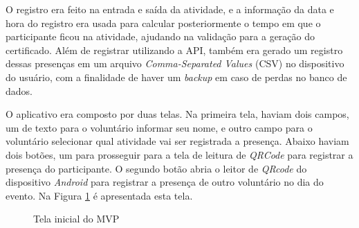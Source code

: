 O registro era feito na entrada e saída da atividade, e a informação da data e hora do registro era usada para calcular posteriormente o tempo em que o participante ficou na atividade, ajudando na validação para a geração do certificado. Além de registrar utilizando a API, também era gerado um registro dessas presenças em um arquivo \textit{Comma-Separated Values} (CSV) no dispositivo do usuário, com a finalidade de haver um \textit{backup} em caso de perdas no banco de dados.

O aplicativo era composto por duas telas. Na primeira tela, haviam dois campos, um de texto para o voluntário informar seu nome, e outro campo para o voluntário selecionar qual atividade vai ser registrada a presença. Abaixo haviam dois botões, um para prosseguir para a tela de leitura de \textit{QRCode} para registrar a presença do participante. O segundo botão abria o leitor de \textit{QRcode} do dispositivo \textit{Android} para registrar a presença de outro voluntário no dia do evento. Na Figura \ref{fig:mvp1} é apresentada esta tela.

\begin{figure}[H]
    \centering
    \caption{Tela inicial do MVP} 
    \label{fig:mvp1}
\end{figure}

